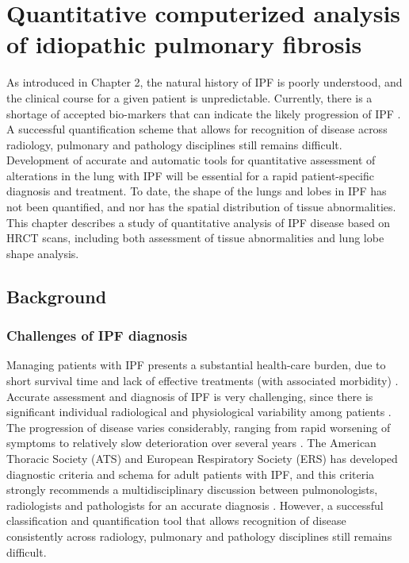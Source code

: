 \chapter{Quantitative computerized analysis of idiopathic pulmonary fibrosis} \label{Yuwen_QuantitiativeAnalysis}

As introduced in Chapter 2, the natural history of IPF is poorly understood, and the clinical course for a given patient is unpredictable. Currently, there is a shortage of accepted bio-markers that can indicate the likely progression of IPF \citep{bartholmai2013quantitative}. A successful quantification scheme that allows for recognition of disease across radiology, pulmonary and pathology disciplines still remains difficult. Development of accurate and automatic tools for quantitative assessment of alterations in the lung with IPF will be essential for a rapid patient-specific diagnosis and treatment. To date, the shape of the lungs and lobes in IPF has not been quantified, and nor has the spatial distribution of tissue abnormalities. This chapter describes a study of quantitative analysis of IPF disease based on HRCT scans, including both assessment of tissue abnormalities and lung lobe shape analysis. 

\section{Background}
\subsection{Challenges of IPF diagnosis} \label{Challenge}
Managing patients with IPF presents a substantial health-care burden, due to short survival time and lack of effective treatments (with associated morbidity) \citep{olson2007mortality,raghunath2014quantitative}. Accurate assessment and diagnosis of IPF is very challenging, since there is significant individual radiological and physiological variability among patients \citep{devaraj2014imaging}. The progression of disease varies considerably, ranging from rapid worsening of symptoms to relatively slow deterioration over several years \citep{king2011idiopathic,richeldi2017idiopathic}. The American Thoracic Society (ATS) and European Respiratory Society (ERS) has developed diagnostic criteria and schema for adult patients with IPF, and this criteria strongly recommends a multidisciplinary discussion between pulmonologists, radiologists and pathologists for an accurate diagnosis \citep{raghu2011official,travis2013official}. However, a successful classification and quantification tool that allows recognition of disease consistently across radiology, pulmonary and pathology disciplines still remains difficult. 

